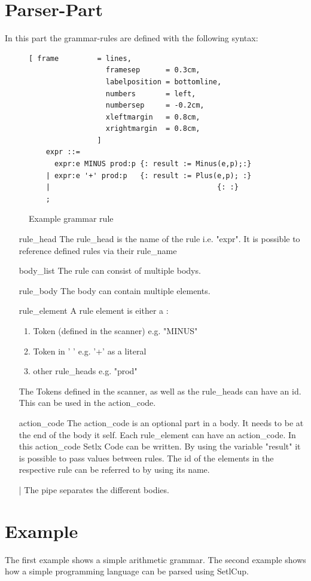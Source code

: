 \section{Parser-Part}
In this part the grammar-rules are defined with the following syntax:
\begin{figure}[!ht]
\begin{Verbatim}[ frame         = lines, 
                  framesep      = 0.3cm, 
                  labelposition = bottomline,
                  numbers       = left,
                  numbersep     = -0.2cm,
                  xleftmargin   = 0.8cm,
                  xrightmargin  = 0.8cm,
                ]
	expr ::= 
	  expr:e MINUS prod:p {: result := Minus(e,p);:} 
	| expr:e '+' prod:p   {: result := Plus(e,p); :} 
	| 										{: :}
	;
\end{Verbatim}
\caption{Example grammar rule}
\label{fig:example_grammer}
\end{figure}
\begin{itemize}
	\item[rule\_head] The rule\_head is the name of the rule i.e. "expr". It is possible to reference defined rules via their rule\_name
	\item[body\_list] The rule can consist of multiple bodys.
	\item[rule\_body] The body can contain multiple elements. 
	\item[rule\_element] A rule element is either a :
	\begin{enumerate}
		\item Token (defined in the scanner) e.g. "MINUS"
		\item Token in  ' ' e.g. '+' as a literal
		\item other rule\_heads e.g. "prod"
	\end{enumerate}
	The Tokens defined in the scanner, as well as the rule\_heads can have an id. This can be used in the action\_code.
	\item[action\_code] The action\_code is an optional part in a body. It needs to be at the end of the body it self. Each rule\_element can have an action\_code. In this action\_code Setlx Code can be written. By using the variable "result" it is possible to pass values between rules. The id of the elements in the respective rule can be referred to by using its name.
	\item[|] The pipe separates the different bodies.
\end{itemize}
\newpage
\section{Example}
The first example shows a simple arithmetic grammar.
The second example shows how a simple programming language can be parsed using SetlCup.
